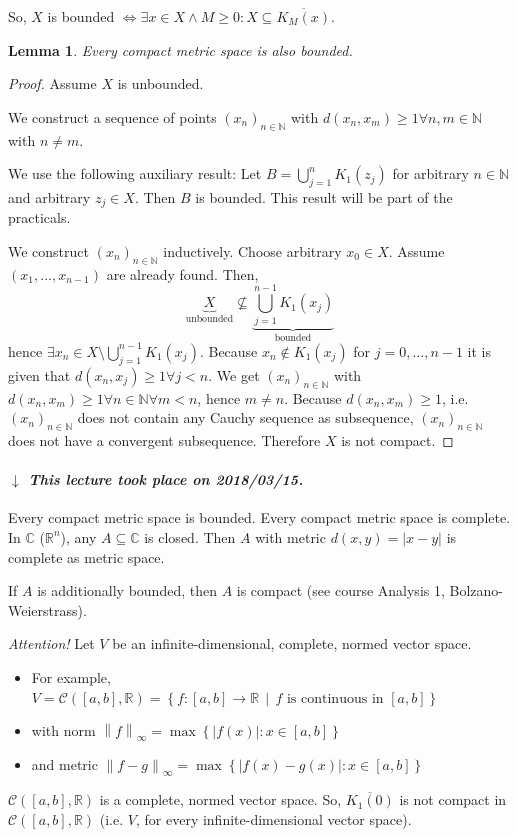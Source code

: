 \documentclass{article}
\newtheorem{lemma}{Lemma}  \numberwithin{lemma}{section}
\newcommand{\set}[1]{\left\{#1\right\}}
\newcommand{\setdef}[2]{\left\{\left.#1\,\middle|\,#2\right.\right\}}
\newcommand{\norm}[1]{\left\|#1\right\|}
\newcommand{\card}[1]{\left|#1\right|}
\newcommand{\dateref}[1]{%
  \begin{mdframed}[backgroundcolor=gray!10,innerbottommargin=0pt,innertopmargin=0pt]
    \paragraph{\textit{$\downarrow$ This lecture took place on #1.}}%
  \end{mdframed}%
}
\begin{document}
So, $X$ is bounded $\iff \exists x \in X \land M \geq 0: X \subseteq \overline{K_M(x)}$.

\begin{lemma} %
  Every compact metric space is also bounded.
\end{lemma}

\begin{proof}
  Assume $X$ is unbounded.

  We construct a sequence of points $(x_n)_{n \in \mathbb N}$ with $d(x_n, x_m) \geq 1 \forall n,m \in \mathbb N$ with $n \neq m$.

  We use the following auxiliary result: Let $B = \bigcup_{j=1}^n K_1(z_j)$ for arbitrary $n \in \mathbb N$ and arbitrary $z_j \in X$. Then $B$ is bounded. This result will be part of the practicals.

  We construct $(x_n)_{n\in\mathbb N}$ inductively. Choose arbitrary $x_0 \in X$. Assume $(x_1, \dots, x_{n-1})$ are already found. Then,
  \[ \underbrace{X}_{\text{unbounded}} \not\subseteq \underbrace{\bigcup_{j=1}^{n-1} K_1(x_j)}_{\text{bounded}} \]
  hence $\exists x_n \in X \setminus \bigcup_{j=1}^{n-1} K_1(x_j)$.
  Because $x_n \not\in K_1(x_j)$ for $j = 0, \dots, n-1$ it is given that $d(x_n, x_j) \geq 1 \forall j < n$. We get $(x_n)_{n \in \mathbb N}$ with $d(x_n, x_m) \geq 1 \forall n \in \mathbb N \forall m < n$, hence $m \neq n$. Because $d(x_n, x_m) \geq 1$, i.e. $(x_n)_{n \in \mathbb N}$ does not contain any Cauchy sequence as subsequence, $(x_n)_{n \in \mathbb N}$ does not have a convergent subsequence. Therefore $X$ is not compact.
\end{proof}

\dateref{2018/03/15}

Every compact metric space is bounded. Every compact metric space is complete.
In $\mathbb C$ ($\mathbb R^n$), any $A \subseteq \mathbb C$ is closed.
Then $A$ with metric $d(x,y) = \card{x - y}$ is complete as metric space.

If $A$ is additionally bounded, then $A$ is compact (see course Analysis 1, Bolzano-Weierstrass).

\emph{Attention!} Let $V$ be an infinite-dimensional, complete, normed vector space.
\begin{itemize}
  \item For example, $V = \mathcal C([a,b], \mathbb R) = \setdef{f: [a,b] \to \mathbb R}{f \text{ is continuous in } [a,b]}$
  \item with norm $\norm{f}_{\infty} = \max\set{\card{f(x)}: x \in [a,b]}$
  \item and metric $\norm{f - g}_{\infty} = \max\set{\card{f(x) - g(x)}: x \in [a,b]}$
\end{itemize}
$\mathcal C([a,b], \mathbb R)$ is a complete, normed vector space.
So, $\overline{K_1(0)}$ is not compact in $\mathcal C([a,b], \mathbb R)$ (i.e. $V$, for every infinite-dimensional vector space).
\end{document}
